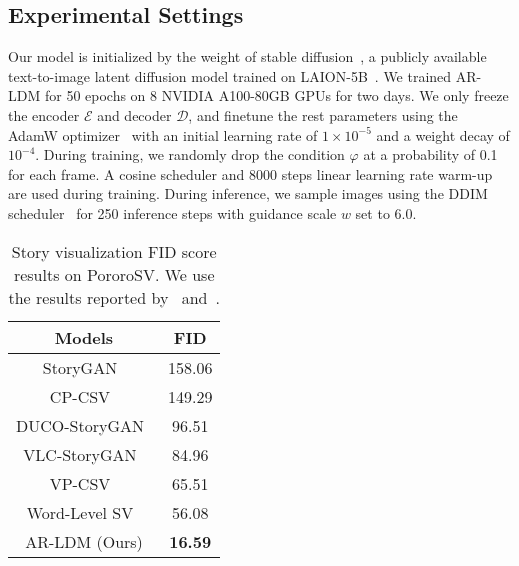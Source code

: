 \documentclass[10pt,twocolumn,letterpaper]{article}
\begin{document}
\subsection{Experimental Settings}
Our model is initialized by the weight of stable diffusion~\cite{ldm}, a publicly available text-to-image latent diffusion model trained on LAION-5B~\cite{laion}. We trained AR-LDM for 50 epochs on 8 NVIDIA A100-80GB GPUs for two days. We only freeze the encoder $\mathcal{E}$ and decoder $\mathcal{D}$, and finetune the rest parameters using the AdamW optimizer~\cite{adamw} with an initial learning rate of $1 \times 10^{-5}$ and a weight decay of $10^{-4}$. During training, we randomly drop the condition $\varphi$ at a probability of 0.1 for each frame. A cosine scheduler and 8000 steps linear learning rate warm-up are used during training. During inference, we sample images using the DDIM scheduler~\cite{ddim} for 250 inference steps with guidance scale $w$ set to 6.0.

\begin{table}[!t]
\small
\centering
\setlength\tabcolsep{30pt}
\begin{tabularx}{\linewidth}{cc}
    \toprule
    Models & FID \\
    \midrule
    StoryGAN~\cite{storygan} & 158.06  \\
    CP-CSV~\cite{cpcsv} & 149.29 \\
    DUCO-StoryGAN~\cite{ducostorygan} & 96.51  \\
    VLC-StoryGAN~\cite{vlcstorygan} & 84.96  \\
    VP-CSV~\cite{vpcsv} & 65.51 \\
    Word-Level SV~\cite{wordlevelsv} & 56.08 \\
    AR-LDM (Ours) & \textbf{16.59} \\
    \bottomrule
    \end{tabularx}
\caption{Story visualization FID score results on PororoSV. We use the results reported by~\cite{vpcsv} and~\cite{wordlevelsv}.}
\label{tb:visualizationfid}
\end{table}
\end{document}
